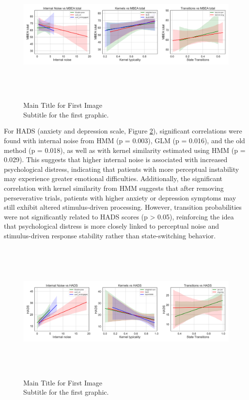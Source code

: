\begin{figure}[H]
    \centering
    \includegraphics[width=17cm,height=7cm]{MainLayout/Images/chapter8/regression_results_mbea_total.jpg}
    \caption{Main Title for First Image \\ \small Subtitle for the first graphic.}
    \label{fig:regression_results_mbea_total}
\end{figure}
For HADS (anxiety and depression scale, Figure \ref{fig:regression_results_hads}), significant correlations were found with internal noise from HMM (p = 0.003), GLM (p = 0.016), and the old method (p = 0.018), as well as with kernel similarity estimated using HMM (p = 0.029). This suggests that higher internal noise is associated with increased psychological distress, indicating that patients with more perceptual instability may experience greater emotional difficulties. Additionally, the significant correlation with kernel similarity from HMM suggests that after removing perseverative trials, patients with higher anxiety or depression symptoms may still exhibit altered stimulus-driven processing. However, transition probabilities were not significantly related to HADS scores (p > 0.05), reinforcing the idea that psychological distress is more closely linked to perceptual noise and stimulus-driven response stability rather than state-switching behavior.
\begin{figure}[H]
    \centering
    \includegraphics[width=17cm,height=7cm]{MainLayout/Images/chapter8/regression_results_hads.jpg}
    \caption{Main Title for First Image \\ \small Subtitle for the first graphic.}
    \label{fig:regression_results_hads}
\end{figure}
